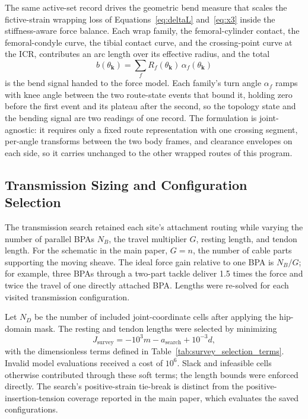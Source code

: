 \documentclass[utf8]{frontiers_suppmat} %
\begin{document}
The same active-set record drives the geometric bend measure that scales the fictive-strain wrapping loss of Equations~\eqref{eq:deltaL} and~\eqref{eq:x3} inside the stiffness-aware force balance. Each wrap family, the femoral-cylinder contact, the femoral-condyle curve, the tibial contact curve, and the crossing-point curve at the ICR, contributes an arc length over its effective radius, and the total
\begin{equation}
b(\theta_{\mathbf{k}}) = \sum_{f} R_{f}(\theta_{\mathbf{k}})\, \alpha_{f}(\theta_{\mathbf{k}})
\label{eq:app_bend_measure}
\end{equation}
is the bend signal handed to the force model. Each family's turn angle $\alpha_{f}$ ramps with knee angle between the two route-state events that bound it, holding zero before the first event and its plateau after the second, so the topology state and the bending signal are two readings of one record. The formulation is joint-agnostic: it requires only a fixed route representation with one crossing segment, per-angle transforms between the two body frames, and clearance envelopes on each side, so it carries unchanged to the other wrapped routes of this program.


\subsection{Transmission Sizing and Configuration Selection}\label{app:transmission_selection}

The transmission search retained each site's attachment routing while varying the number of parallel BPAs $N_B$, the travel multiplier $G$, resting length, and tendon length. For the schematic in the main paper, $G=n$, the number of cable parts supporting the moving sheave. The ideal force gain relative to one BPA is $N_B/G$; for example, three BPAs through a two-part tackle deliver 1.5 times the force and twice the travel of one directly attached BPA. Lengths were re-solved for each visited transmission configuration.

Let $N_D$ be the number of included joint-coordinate cells after applying the hip-domain mask. The resting and tendon lengths were selected by minimizing
\begin{equation}
J_{\mathrm{survey}}=-10^3 m-a_{\mathrm{search}}+10^{-3}d,
\label{eq:survey_selection_cost}
\end{equation}
with the dimensionless terms defined in Table~\ref{tab:survey_selection_terms}. Invalid model evaluations received a cost of $10^6$. Slack and infeasible cells otherwise contributed through these soft terms; the length bounds were enforced directly. The search's positive-strain tie-break is distinct from the positive-insertion-tension coverage reported in the main paper, which evaluates the saved configurations.
\end{document}
